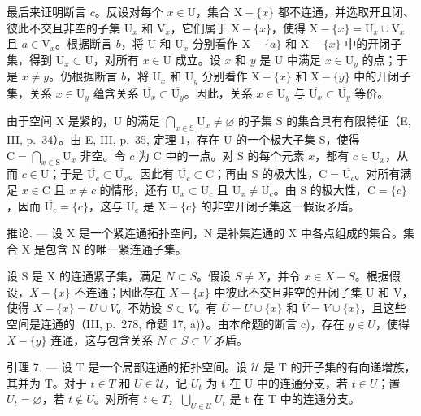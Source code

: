 最后来证明断言 \(c\)。反设对每个 \(x \in \mathrm{U}\)，集合 \(\mathrm{X} - \{x\}\) 都不连通，并选取开且闭、彼此不交且非空的子集 \(\mathrm{U}_x\) 和 \(\mathrm{V}_x\)，它们属于 \(\mathrm{X} - \{x\}\)，使得 \(\mathrm{X} - \{x\} = \mathrm{U}_x \cup \mathrm{V}_x\) 且 \(a \in \mathrm{V}_x\)。根据断言 \(b\)，将 \(\mathrm{U}\) 和 \(\mathrm{U}_x\) 分别看作 \(\mathrm{X} - \{a\}\) 和 \(\mathrm{X} - \{x\}\) 中的开闭子集，得到 \(\overline{\mathrm{U}_x} \subset \mathrm{U}\)，对所有 \(x \in \mathrm{U}\) 成立。设 \(x\) 和 \(y\) 是 U 中满足 \(x \in \mathrm{U}_y\) 的点；于是 \(x \neq y\)。仍根据断言 \(b\)，将 \(\mathrm{U}_x\) 和 \(\mathrm{U}_y\) 分别看作 \(\mathrm{X} - \{x\}\) 和 \(\mathrm{X} - \{y\}\) 中的开闭子集，关系 \(x \in \mathrm{U}_y\) 蕴含关系 \(\overline{\mathrm{U}_x} \subset \overline{\mathrm{U}_y}\)。因此，关系 \(x \in \mathrm{U}_y\) 与 \(\overline{\mathrm{U}_x} \subset \overline{\mathrm{U}_y}\) 等价。

由于空间 X 是紧的，U 的满足 \(\bigcap_{x\in\mathrm{S}}\overline{\mathrm{U}_{x}}\neq\varnothing\) 的子集 S 的集合具有有限特征（E, III, p.~34）。由 E, III, p.~35, 定理 1，存在 U 的一个极大子集 S，使得 \(\mathrm{C}=\bigcap_{x\in\mathrm{S}}\overline{\mathrm{U}_{x}}\) 非空。令 \(c\) 为 C 中的一点。对 S 的每个元素 \(x\)，都有 \(c\in\overline{\mathrm{U}_{x}}\)，从而 \(c\in\mathrm{U}\)；于是 \(\overline{\mathrm{U}_{c}}\subset\overline{\mathrm{U}_{x}}\)。因此有 \(\overline{\mathrm{U}_{c}}\subset\mathrm{C}\)；再由 S 的极大性，\(\mathrm{C}=\overline{\mathrm{U}_{c}}\)。对所有满足 \(x\in\mathrm{C}\) 且 \(x\neq c\) 的情形，还有 \(\overline{\mathrm{U}_{x}}\subset\overline{\mathrm{U}_{c}}\) 且 \(\overline{\mathrm{U}_{x}}\neq\overline{\mathrm{U}_{c}}\)。由 S 的极大性，\(\mathrm{C}=\{c\}\)，因而 \(\overline{\mathrm{U}_{c}}=\{c\}\)，这与 \(\mathrm{U}_{c}\) 是 \(\mathrm{X} - \{c\}\) 的非空开闭子集这一假设矛盾。

推论. --- 设 X 是一个紧连通拓扑空间，N 是补集连通的 X 中各点组成的集合。集合 X 是包含 N 的唯一紧连通子集。

设 S 是 X 的连通紧子集，满足 \(N \subset S\)。假设 \(S \neq X\)，并令 \(x \in X - S\)。根据假设，\(X - \{x\}\) 不连通；因此存在 \(X - \{x\}\) 中彼此不交且非空的开闭子集 U 和 V，使得 \(X - \{x\} = U \cup V\)。不妨设 \(S \subset V\)。有 \(\overline{U} = U \cup \{x\}\) 和 \(\overline{V} = V \cup \{x\}\)，且这些空间是连通的（III, p.~278, 命题 17, a)）。由本命题的断言 c)，存在 \(y \in U\)，使得 \(X - \{y\}\) 连通，这与包含关系 \(N \subset S \subset V\) 矛盾。

引理 7. --- 设 T 是一个局部连通的拓扑空间。设 \(\mathcal{U}\) 是 T 的开子集的有向递增族，其并为 T。对于 \(t \in T\) 和 \(U \in \mathcal{U}\)，记 \(U_{t}\) 为 t 在 U 中的连通分支，若 \(t \in U\)；置 \(U_{t} = \varnothing\)，若 \(t \notin U\)。对所有 \(t \in T\)，\(\bigcup_{U \in \mathcal{U}} U_{t}\) 是 t 在 T 中的连通分支。

